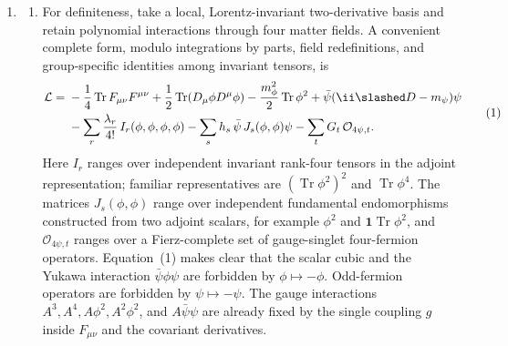 \begin{enumerate}
\begin{enumerate}
    \item[(c)]
      \begin{enumerate}
        \item[(i)] For definiteness, take a local, Lorentz-invariant
          two-derivative basis and retain polynomial interactions through
          four matter fields.  A convenient complete form, modulo
          integrations by parts, field redefinitions, and group-specific
          identities among invariant tensors, is
          \[
          \begin{split}
            \mathcal L={}&-\frac14\operatorname{Tr}F_{\mu\nu}F^{\mu\nu}
              +\frac12\operatorname{Tr}(D_\mu\phi D^\mu\phi)
              -\frac{m_\phi^2}{2}\operatorname{Tr}\phi^2
              +\bar\psi(\ii\slashed D-m_\psi)\psi\\
             &-\sum_r\frac{\lambda_r}{4!}\,
                I_r(\phi,\phi,\phi,\phi)
              -\sum_s h_s\,
                \bar\psi\,J_s(\phi,\phi)\psi
              -\sum_t G_t\,\mathcal O_{4\psi,t}.
          \end{split}                                      \tag{1}
          \]
          Here \(I_r\) ranges over independent invariant rank-four tensors
          in the adjoint representation; familiar representatives are
          \((\operatorname{Tr}\phi^2)^2\) and
          \(\operatorname{Tr}\phi^4\).  The matrices
          \(J_s(\phi,\phi)\) range over independent fundamental
          endomorphisms constructed from two adjoint scalars, for example
          \(\phi^2\) and \(\mathbf1\operatorname{Tr}\phi^2\), and
          \(\mathcal O_{4\psi,t}\) ranges over a Fierz-complete set of
          gauge-singlet four-fermion operators.  Equation~(1) makes clear
          that the scalar cubic and the Yukawa interaction
          \(\bar\psi\phi\psi\) are forbidden by
          \(\phi\mapsto-\phi\).  Odd-fermion operators are forbidden by
          \(\psi\mapsto-\psi\).  The gauge interactions
          \(A^3,A^4,A\phi^2,A^2\phi^2\), and \(A\bar\psi\psi\) are already
          fixed by the single coupling \(g\) inside \(F_{\mu\nu}\) and the
          covariant derivatives.


\end{enumerate}
\end{enumerate}
\end{enumerate}
